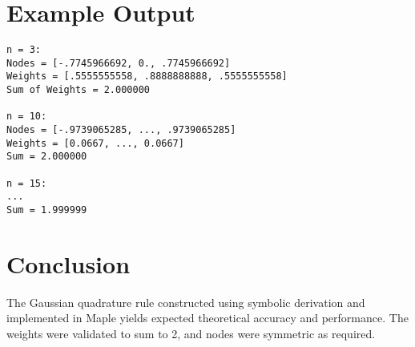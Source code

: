 \documentclass{article}
\begin{document}
\section{Example Output}

\begin{verbatim}
n = 3:
Nodes = [-.7745966692, 0., .7745966692]
Weights = [.5555555558, .8888888888, .5555555558]
Sum of Weights = 2.000000

n = 10:
Nodes = [-.9739065285, ..., .9739065285]
Weights = [0.0667, ..., 0.0667]
Sum = 2.000000

n = 15:
...
Sum = 1.999999
\end{verbatim}

\section{Conclusion}

The Gaussian quadrature rule constructed using symbolic derivation and implemented in Maple yields expected theoretical accuracy and performance. The weights were validated to sum to 2, and nodes were symmetric as required.
\end{document}
